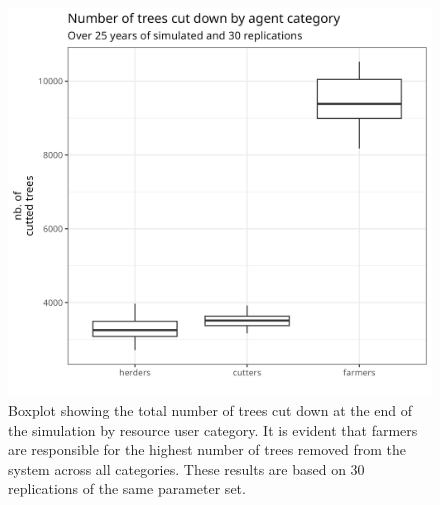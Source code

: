 \documentclass{article}
\begin{document}
 \begin{figure}
    \centering
    \includegraphics[width=\textwidth]{./img/rep_treeKilled.png}
    \caption{Boxplot showing the total number of trees cut down at the end of the simulation by resource user category. It is evident that farmers are responsible for the highest number of trees removed from the system across all categories. These results are based on 30 replications of the same parameter set.}
    \label{fig:treeKilled}
\end{figure}
\FloatBarrier

\end{document}
